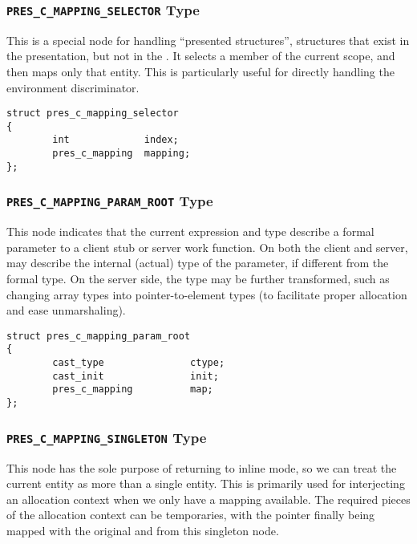 \subsubsection{\texttt{PRES\_C\_MAPPING\_SELECTOR} Type}

This is a special node for handling ``presented structures'', structures that
exist in the presentation, but not in the \MINT{}\@.  It selects a member of
the current \CAST{} scope, and then maps only that entity.  This is
particularly useful for directly handling the \CORBA{} environment
discriminator.

\begin{verbatim}
struct pres_c_mapping_selector
{
        int             index;
        pres_c_mapping  mapping;
};
\end{verbatim}

\subsubsection{\texttt{PRES\_C\_MAPPING\_PARAM\_ROOT} Type}

This node indicates that the current \CAST{} expression and type describe a
formal parameter to a client stub or server work function.  On both the client
and server,  may describe the internal (actual) type of the
parameter, if different from the formal type.  On the server side, the type may
be further transformed, such as changing array types into pointer-to-element
types (to facilitate proper allocation and ease unmarshaling).

\begin{verbatim}
struct pres_c_mapping_param_root
{
        cast_type               ctype;
        cast_init               init;
        pres_c_mapping          map;
};
\end{verbatim}

\subsubsection{\texttt{PRES\_C\_MAPPING\_SINGLETON} Type}

This node has the sole purpose of returning to inline mode, so we can treat the
current entity as more than a single entity.  This is primarily used for
interjecting an allocation context when we only have a mapping available.  The
required pieces of the allocation context can be temporaries, with the pointer
finally being mapped with the original \CAST{} and \MINT{} from this singleton
node.

